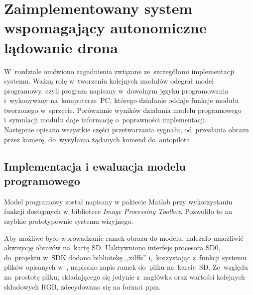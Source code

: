 \chapter{Zaimplementowany system wspomagający autonomiczne lądowanie drona}
\label{cha:opis_implementacji}
W~rozdziale omówiono zagadnienia związane ze~szczegółami implementacji systemu. Ważną rolę w~tworzeniu kolejnych modułów odegrał model programowy, czyli program napisany w~dowolnym języku programowania i~wykonywany na~komputerze~PC, którego działanie oddaje funkcje modułu tworzonego w~sprzęcie. Porównanie wyników działania modelu programowego i~symulacji modułu daje informację o~poprawności implementacji. \\
Następnie opisano wszystkie części przetwarzania sygnału, od~przesłania obrazu przez kamerę, do~wysyłania żądanych komend do~autopilota.
\section{Implementacja i ewaluacja modelu programowego}
\label{sec:implementacja_modelu_programowego}

Model programowy został napisany w pakiecie Matlab przy wykorzystaniu funkcji dostępnych w~bibliotece \textit{Image Processing Toolbox}. 
Pozwoliło to na szybkie prototypownie systemu wizyjnego.




Aby możliwe było wprowadzanie ramek obrazu do modelu, należało umożliwić akwizycję obrazów na~kartę SD. 
Uaktywniono interfejs procesora SD0, do~projektu w~SDK dodano bibliotekę ,,xilffs'' i,~korzystając z~funkcji systemu plików opisanych w~\cite{xilffs}, napisano zapis ramek do~pliku na~karcie~SD. 
Ze~względu na~prostotę pliku, składającego się jedynie z~nagłówka oraz wartości kolejnych składowych RGB, zdecydowano się na format ppm.\\


